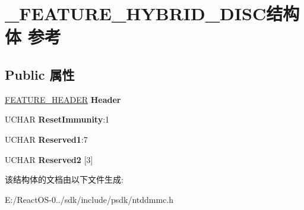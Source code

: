 \hypertarget{struct___f_e_a_t_u_r_e___h_y_b_r_i_d___d_i_s_c}{}\section{\+\_\+\+F\+E\+A\+T\+U\+R\+E\+\_\+\+H\+Y\+B\+R\+I\+D\+\_\+\+D\+I\+S\+C结构体 参考}
\label{struct___f_e_a_t_u_r_e___h_y_b_r_i_d___d_i_s_c}
\subsection*{Public 属性}
\begin{DoxyCompactItemize}
\item 
\mbox{\label{struct___f_e_a_t_u_r_e___h_y_b_r_i_d___d_i_s_c_a9674f9a703980fd891717d3031878c70}} 
\hyperlink{struct___f_e_a_t_u_r_e___h_e_a_d_e_r}{F\+E\+A\+T\+U\+R\+E\+\_\+\+H\+E\+A\+D\+ER} {\bfseries Header}
\item 
\mbox{\label{struct___f_e_a_t_u_r_e___h_y_b_r_i_d___d_i_s_c_a1986719c97c49200c53cc48ade545a4f}} 
U\+C\+H\+AR {\bfseries Reset\+Immunity}\+:1
\item 
\mbox{\label{struct___f_e_a_t_u_r_e___h_y_b_r_i_d___d_i_s_c_a13b4aeca52e27bfcd8f5b8719d4eb1e9}} 
U\+C\+H\+AR {\bfseries Reserved1}\+:7
\item 
\mbox{\label{struct___f_e_a_t_u_r_e___h_y_b_r_i_d___d_i_s_c_a18b7881a8bf4ba9087b3dcda1312d06a}} 
U\+C\+H\+AR {\bfseries Reserved2} \mbox{[}3\mbox{]}
\end{DoxyCompactItemize}


该结构体的文档由以下文件生成\+:\begin{DoxyCompactItemize}
\item 
E\+:/\+React\+O\+S-\/0../sdk/include/psdk/ntddmmc.\+h\end{DoxyCompactItemize}
